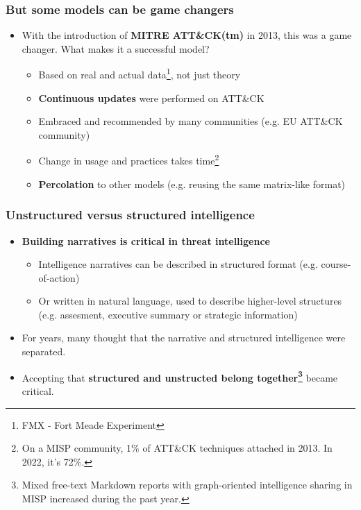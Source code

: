 \begin{frame}
  \frametitle{But some models can be game changers}
  \begin{itemize}
      \item With the introduction of {\bf MITRE ATT\&CK(tm)} in 2013, this was a game changer. What makes it a successful model?
     \begin{itemize}
        \item Based on real and actual data\footnote{FMX - Fort Meade Experiment}, not just theory
        \item {\bf Continuous updates} were performed on ATT\&CK
        \item Embraced and recommended by many communities (e.g. EU ATT\&CK community)
        \item Change in usage and practices takes time\footnote{On a MISP community, 1\% of ATT\&CK techniques attached in 2013. In 2022, it's 72\%.}
        \item {\bf Percolation} to other models (e.g. reusing the same matrix-like format)
     \end{itemize}
  \end{itemize}
\end{frame}

\begin{frame}
  \frametitle{Unstructured versus structured intelligence}
  \begin{itemize}
      \item {\bf Building narratives is critical in threat intelligence}
        \begin{itemize}
            \item Intelligence narratives can be described in structured format (e.g. course-of-action)
            \item Or written in natural language, used to describe higher-level structures (e.g. assesment, executive summary or strategic information) 
        \end{itemize}
      \item For years, many thought that the narrative and structured intelligence were separated.
      \item Accepting that {\bf structured and unstructed belong together\footnote{Mixed free-text Markdown reports with graph-oriented intelligence sharing in MISP increased during the past year.}} became critical.
  \end{itemize}
\end{frame}

